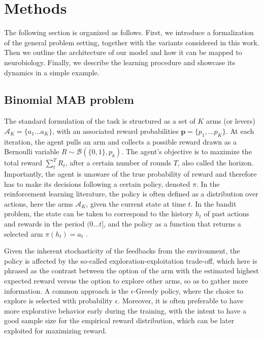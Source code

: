 \section{Methods}

\noindent The following section is organized as follows. First, we introduce a formalization of the general problem setting, together with the variants considered in this work. Then we outline the architecture of our model and how it can be mapped to neurobiology. Finally, we describe the learning procedure
and showcase its dynamics in a simple example.

\subsection{Binomial MAB problem}
\hfill \break
\noindent The standard formulation of the task is structured as a set of $K$ arms (or levers) $\mathcal{A}_{K}=\{a_{1}\ldots a_{K}\}$, with an associated reward probabilities $\mathbf{p}=\{p_{1}, \ldots p_{K}\}$.
At each iteration, the agent pulls an arm and collects a possible reward drawn as a Bernoulli variable $R\sim \mathcal{B}(\{0,1\},p_{k})$. The agent's objective is to maximize the total reward $\sum^{T}_{t} R_{t}$, after a certain number of rounds $T$, also called the horizon.
Importantly, the agent is unaware of the true probability of reward and therefore has to make its decisions following a certain policy, denoted $\pi$.
In the reinforcement learning literature, the policy is often defined as a distribution over actions, here the arms $\mathcal{A}_{K}$, given the current state at time $t$. In the bandit problem, the state can be taken to correspond to the history $h_{t}$ of past actions and rewards in the period
$(0\ldots t]$, and the policy as a function that returns a selected arm $\pi(h_{t})=a_{t}$ \cite{qiForcedExplorationBandit2023}.

Given the inherent stochasticity of the feedbacks from the environment, the policy is affected by the so-called exploration-exploitation trade-off, which here is phrased as the contrast between the option of the arm with the estimated highest expected reward versus the option to explore other arms, so as to gather more information.
A common approach is the $\epsilon$-Greedy policy, where the choice to explore is selected with probability $\epsilon$.
Moreover, it is often preferable to have more explorative behavior early during the training, with the intent to have a good sample size for the empirical reward distribution, which can be later exploited for maximizing reward.

